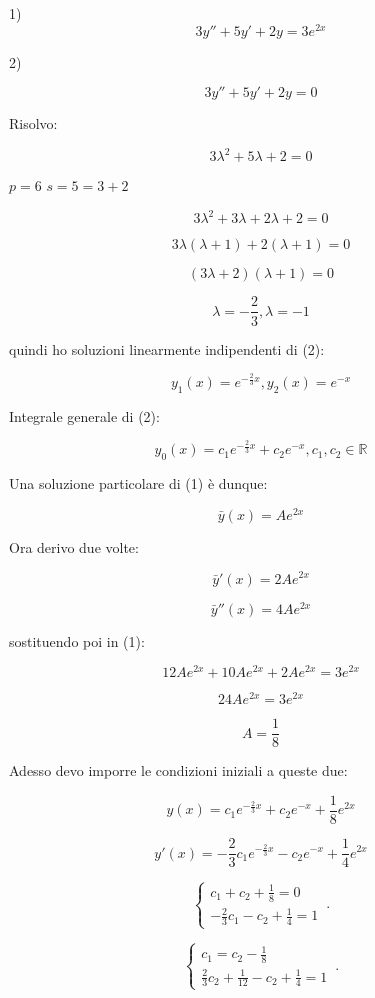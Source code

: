 \documentclass[../appunti-analisi.tex]{subfiles}
\begin{document}
1)
\[
    3y''+5y'+2y = 3 e^{2x}
\]

2)

\[
    3y''+5y'+2y = 0
\]

Risolvo:

\[
    3 \lambda ^{2} + 5 \lambda + 2 = 0
\]

$p = 6$ $s=5= 3+2$ 

\[
    3 \lambda^{2} + 3 \lambda + 2 \lambda + 2 =0
\]

\[
    3 \lambda ( \lambda+1) + 2( \lambda + 1) =0
\]

\[
    (3 \lambda +2 ) ( \lambda +1 ) =0
\]

\[
    \lambda= -\frac{2}{3}, \lambda=-1
\]

quindi ho soluzioni linearmente indipendenti di (2):

\[
    y_1(x) = e ^{-\frac{2}{3}x}, y_2(x) = e ^{-x}
\]

Integrale generale di (2):

\[
    y_0(x) = c_1 e^{-\frac{2}{3}x} + c_2 e ^{-x},c_1,c_2 \in \mathbb{R}
\]


Una soluzione particolare di (1) è dunque:

\[
    \bar{y} (x) = A e ^{2x}
\]

Ora derivo due volte:

\[
    \bar{y} '(x) = 2A e ^{2x}
\]

\[
    \bar{y} ''(x) = 4A e ^{2x}
\]

sostituendo poi in (1):

\[
    12Ae ^{2x} + 10 A e ^{2x} + 2 A e ^{2x} = 3 e^{2x}
\]

\[
    24A e ^{2x} = 3 e ^{2x}
\]

\[
    A = \frac{1}{8}
\]

Adesso devo imporre le condizioni iniziali a queste due:

\[
    y(x) = c_1 e ^{-\frac{2}{3}x} + c_2 e ^{-x}+ \frac{1}{8}e ^{2x}
\]

\[
    y'(x) = -\frac{2}{3}c_1 e ^{-\frac{2}{3}x} - c_2 e ^{-x}+ \frac{1}{4} e ^{2x}
\]


    \begin{equation}
        \begin{cases}
            c_1+c_2+\frac{1}{8}=0\\
            -\frac{2}{3}c_1-c_2+\frac{1}{4}=1
        \end{cases}\,.
    \end{equation}

    \begin{equation}
        \begin{cases}
            c_1=c_2-\frac{1}{8}\\
            \frac{2}{3}c_2+\frac{1}{12}-c_2+\frac{1}{4}=1
        \end{cases}\,.
    \end{equation}
\end{document}
